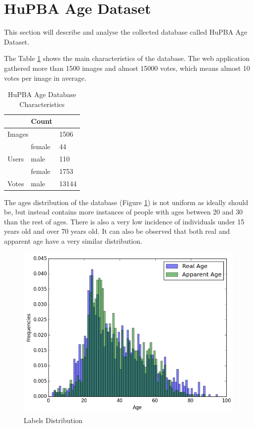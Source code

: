 \section{HuPBA Age Dataset}

This section will describe and analyse the collected database called HuPBA Age Dataset.

The Table \ref{tab:charact} shows the main characteristics of the database. The web application gathered more than 1500 images and almost 15000 votes, which means almost 10 votes per image in average.

\begin{table}[h]
	\centering
	\begin{tabular}{|c|l|l|}
		\rowcolor[HTML]{EFEFEF} 
		\hline
		\multicolumn{2}{|l|}{\cellcolor[HTML]{EFEFEF}\textbf{Features}} & Count \\ \hline
		\multicolumn{2}{|l|}{Images}                                    & 1506  \\ \hline
		& female                & 44    \\ \cline{2-3} 
		\multirow{-2}{*}{Users}                 & male                  & 110   \\ \hline
		& female                & 1753  \\ \cline{2-3} 
		\multirow{-2}{*}{Votes}                 & male                  & 13144 \\ \hline
	\end{tabular}
	\caption{HuPBA Age Database Characteristics}
	\label{tab:charact}
\end{table}
	
The ages distribution of the database (Figure \ref{fig:distr}) is not uniform as ideally should be, but instead contains more instances of people with ages between 20 and 30 than the rest of ages. There is also a very low incidence of individuals under 15 years old and over 70 years old. It can also be observed that both real and apparent age have a very similar distribution.

\begin{figure}[h!]
	\centering
	\includegraphics[width=\textwidth]{figures/Label_Distribution}
	\caption{Labels Distribution}
	\label{fig:distr}
\end{figure}

